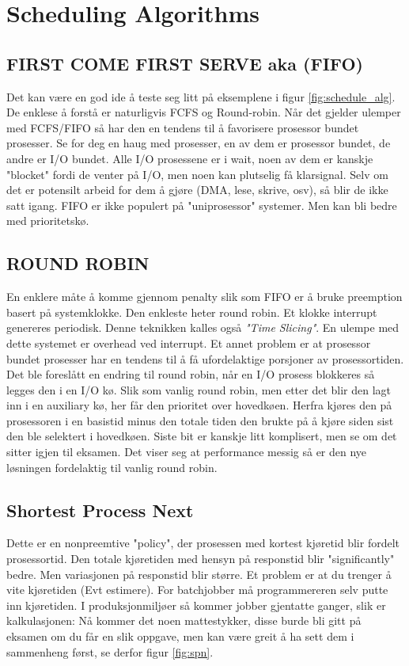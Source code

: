 \section{Scheduling Algorithms}
\subsection{FIRST COME FIRST SERVE aka (FIFO)}
Det kan være en god ide å teste seg litt på eksemplene i figur \ref{fig:schedule_alg}. De enklese å forstå er naturligvis FCFS og Round-robin. Når det gjelder ulemper med FCFS/FIFO så har den en tendens til å favorisere prosessor bundet prosesser. Se for deg en haug med prosesser, en av dem er prosessor bundet, de andre er I/O bundet. Alle I/O prosessene er i wait, noen av dem er kanskje "blocket" fordi de venter på I/O, men noen kan plutselig få klarsignal. Selv om det er potensilt arbeid for dem å gjøre (DMA, lese, skrive, osv), så blir de ikke satt igang. FIFO er ikke populert på "uniprosessor" systemer. Men kan bli bedre med prioritetskø. 
\subsection{ROUND ROBIN}
En enklere måte å komme gjennom penalty slik som FIFO er å bruke preemption basert på systemklokke. Den enkleste heter round robin. Et klokke interrupt genereres periodisk. Denne teknikken kalles også \emph{"Time Slicing"}. En ulempe med dette systemet er overhead ved interrupt. Et annet problem er at prosessor bundet prosesser har en tendens til å få ufordelaktige porsjoner av prosessortiden. 
Det ble foreslått en endring til round robin, når en I/O prosess blokkeres så legges den i en I/O kø. Slik som vanlig round robin, men etter det blir den lagt inn i en auxiliary kø, her får den prioritet over hovedkøen. Herfra kjøres den på prosessoren i en basistid minus den totale tiden den brukte på å kjøre siden sist den ble selektert i hovedkøen. Siste bit er kanskje litt komplisert, men se om det sitter igjen til eksamen. Det viser seg at performance messig så er den nye løsningen fordelaktig til vanlig round robin.  
\subsection{Shortest Process Next}
Dette er en nonpreemtive "policy", der prosessen med kortest kjøretid blir fordelt prosessortid. Den totale kjøretiden med hensyn på responstid blir "significantly" bedre. Men variasjonen på responstid blir større. Et problem er at du trenger å vite kjøretiden (Evt estimere). For batchjobber må programmereren selv putte inn kjøretiden. I produksjonmiljøer så kommer jobber gjentatte ganger, slik er kalkulasjonen: Nå kommer det noen mattestykker, disse burde bli gitt på eksamen om du får en slik oppgave, men kan være greit å ha sett dem i sammenheng først, se derfor figur \ref{fig:spn}.

